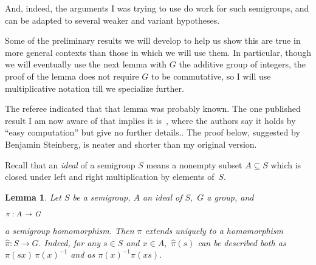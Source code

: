 \documentclass{amsart}
\newtheorem{lemma}[theorem]{Lemma}
\numberwithin{equation}{section}
\numberwithin{theorem}{section}
\begin{document}
And, indeed, the arguments I was trying to use do work for
such semigroups,
and can be adapted to several weaker and variant hypotheses.

Some of the preliminary results we will develop
to help us show this are true in more general contexts
than those in which we will use them.
In particular, though we will eventually use
the next lemma with $G$ the additive group of
integers, the proof of the lemma does not require $G$ to be
commutative, so I will use multiplicative notation till we
specialize further.

The referee indicated that %
that lemma was probably known.
The one published result I am now aware of
that implies it is~\cite[Lemma~3.1]{H+R}, where the authors
say it holds by ``easy computation'' but give no further details..
The proof below, suggested by Benjamin Steinberg,
is neater and shorter than my original version.

Recall that an {\em ideal} of a semigroup $S$ means
a nonempty subset $A\subseteq S$ which is closed under
left and right multiplication by elements of~$S.$

\begin{lemma}\label{L.pi_extends}
Let $S$ be a semigroup, $A$ an ideal of $S,$ $G$ a group, and
%
\begin{equation}\begin{minipage}[c]{35pc}\label{d.pi}
$\pi: A\,\to\,G$
\end{minipage}\end{equation}
%
a semigroup homomorphism.
Then $\pi$ extends uniquely to a homomorphism $\hat{\pi}: S\to G.$
Indeed, for any $s\in S$ and $x\in A,$ $\hat{\pi}(s)$ can be
described both as $\pi(sx)\,\pi(x)^{-1}$ and as $\pi(x)^{-1}\pi(xs).$
\end{lemma}
\end{document}
